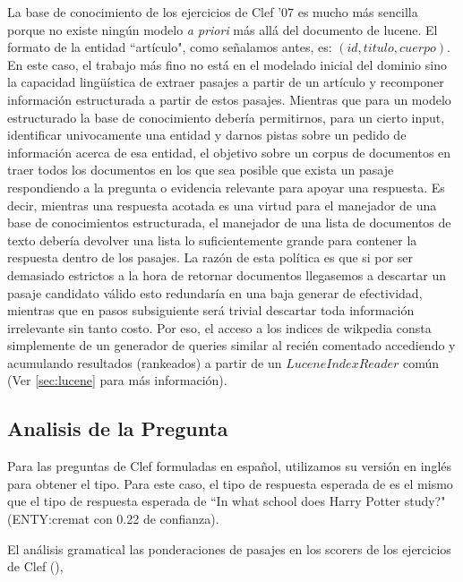 La base de conocimiento de los ejercicios de Clef '07 es mucho más sencilla 
porque no existe ningún modelo \emph{a priori} más allá del documento de lucene.
El formato de la entidad ``artículo", como señalamos antes, es: $(id, titulo, cuerpo)$. 
En este caso, el trabajo más fino no está en el modelado inicial del dominio 
sino la capacidad lingüística de extraer pasajes a partir de un artículo y recomponer información
estructurada a partir de estos pasajes. Mientras que para un modelo estructurado la base de conocimiento
debería permitirnos, para un cierto input, identificar univocamente una entidad y darnos pistas sobre un pedido de
información acerca de esa entidad, el objetivo sobre un corpus de documentos en 
traer todos los documentos en los que sea posible que exista un pasaje respondiendo a la pregunta o
evidencia relevante para apoyar una respuesta. Es decir, mientras una respuesta acotada es una virtud para
el manejador de una base de conocimientos estructurada, el manejador de una lista de documentos de texto debería devolver
una lista lo suficientemente grande para contener la respuesta dentro de los pasajes. La razón de esta política es que si
por ser demasiado estrictos a la hora de retornar documentos llegasemos a descartar un pasaje candidato válido esto
redundaría en una baja generar de efectividad, mientras que en pasos subsiguiente será trivial descartar toda información irrelevante
sin tanto costo. Por eso, el acceso a los indices de wikpedia consta simplemente de un generador de queries similar al recién comentado
accediendo y acumulando resultados (rankeados) a partir de un $LuceneIndexReader$ común (Ver \ref{sec:lucene}  para más información).

\subsection{Analisis de la Pregunta}
 Para las preguntas de Clef formuladas en español, utilizamos su versión en inglés para obtener el tipo.
Para este caso, el tipo de respuesta esperada de  es el mismo que el tipo de respuesta esperada de ``In what school does Harry Potter study?" (ENTY:cremat con 0.22 de confianza). 

El análisis gramatical las ponderaciones de pasajes en los scorers de los ejercicios de Clef (), 

